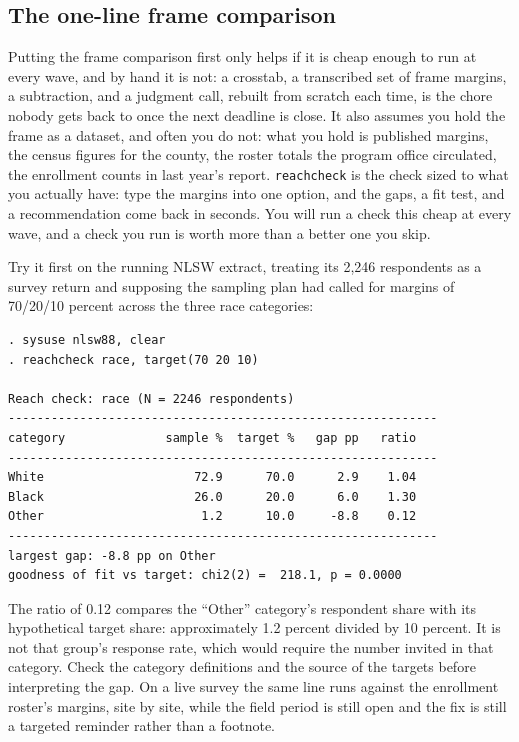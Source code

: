 \subsection{The one-line frame comparison}\label{sec:ch05-reach}
Putting the frame comparison first only helps if it is cheap enough to run at every wave, and by hand it is not: a crosstab, a transcribed set of frame margins, a subtraction, and a judgment call, rebuilt from scratch each time, is the chore nobody gets back to once the next deadline is close. It also assumes you hold the frame as a dataset, and often you do not: what you hold is published margins, the census figures for the county, the roster totals the program office circulated, the enrollment counts in last year's report. \texttt{reachcheck} is the check sized to what you actually have: type the margins into one option, and the gaps, a fit test, and a recommendation come back in seconds. You will run a check this cheap at every wave, and a check you run is worth more than a better one you skip.

Try it first on the running NLSW extract, treating its 2{,}246 respondents as a survey return and supposing the sampling plan had called for margins of 70/20/10 percent across the three race categories:
\par
{\footnotesize
\begin{verbatim}
. sysuse nlsw88, clear
. reachcheck race, target(70 20 10)

Reach check: race (N = 2246 respondents)
------------------------------------------------------------
category              sample %  target %   gap pp   ratio
------------------------------------------------------------
White                     72.9      70.0      2.9    1.04
Black                     26.0      20.0      6.0    1.30
Other                      1.2      10.0     -8.8    0.12
------------------------------------------------------------
largest gap: -8.8 pp on Other
goodness of fit vs target: chi2(2) =  218.1, p = 0.0000
\end{verbatim}
}
The ratio of 0.12 compares the \enquote{Other} category's respondent share with its hypothetical target share: approximately 1.2 percent divided by 10 percent. It is not that group's response rate, which would require the number invited in that category. Check the category definitions and the source of the targets before interpreting the gap. On a live survey the same line runs against the enrollment roster's margins, site by site, while the field period is still open and the fix is still a targeted reminder rather than a footnote.

